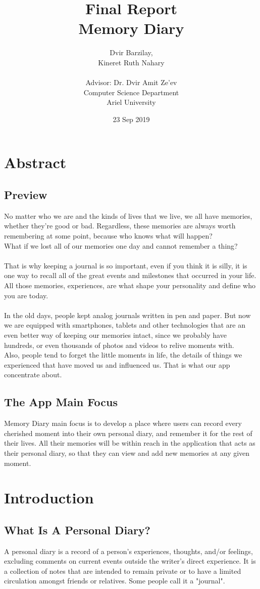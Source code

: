 \documentclass{article}
\title{\textbf{Final Report
\\{\Large Memory Diary}}}
\author{Dvir Barzilay,\\ Kineret Ruth Nahary \\ \\
Advisor: Dr. Dvir Amit Ze'ev \\
Computer Science Department \\
Ariel University 
}
\date{23 Sep 2019}
\begin{document}
\maketitle
\newpage
\tableofcontents
\newpage
\section{Abstract}
\subsection{Preview}
No matter who we are and the kinds of lives that we live, we all have memories, whether they're good or bad. Regardless, these memories are always worth remembering at some point, because who knows what will happen?
\\
What if we lost all of our memories one day and cannot remember a thing?
\\\\
That is why keeping a journal is so important, even if you think it is silly, it is one way to recall all of the great events and milestones that occurred in your life. All those memories, experiences, are what shape your personality and define who you are today.
\\\\
In the old days, people kept analog journals written in pen and paper. But now we are equipped with smartphones, tablets and other technologies that are an even better way of keeping our memories intact, since we probably have hundreds, or even thousands of photos and videos to relive moments with.\\
Also, people tend to forget the little moments in life, the details of things we experienced that have moved us and influenced us. That is what our app concentrate about.
\subsection{The App Main Focus}
Memory Diary main focus is to develop a place where users can record every cherished moment into their own personal diary, and remember it for the rest of their lives. All their memories will be within reach in the application that acts as their personal diary, so that they can view and add new memories at any given moment.

\section{Introduction}
\subsection{What Is A Personal Diary?}
A personal diary is a record of a person's experiences, thoughts, and/or feelings, excluding comments on current events outside the writer's direct experience. It is a collection of notes that are intended to remain private or to have a limited circulation amongst friends or relatives. Some people call it a "journal".
\end{document}
